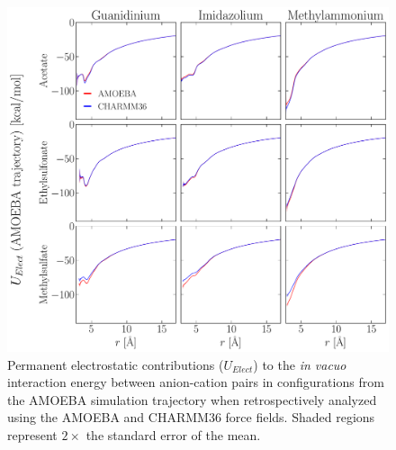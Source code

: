 \documentclass[journal=jacsat,articletitle=true,manuscript=suppinfo,layout=onecolumn]{achemso}
\begin{document}
    \begin{figure}[H]
    \begin{center}
        \includegraphics[width=1\columnwidth]{images/cross_ff_analysis_elect_traj_generated_by_amoeba.pdf}
        \caption{Permanent electrostatic contributions ($U_{Elect}$) to the \emph{in vacuo} interaction energy between anion-cation pairs in configurations from the AMOEBA simulation trajectory when retrospectively analyzed using the AMOEBA and CHARMM36 force fields. Shaded regions represent $2\times$ the standard error of the mean.}
        \label{fig:cross_ff_elect}
    \end{center}
    \end{figure}
\end{document}
